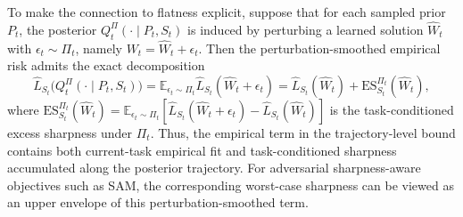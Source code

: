 \documentclass{article}
\begin{document}


To make the connection to flatness explicit, suppose that for each sampled prior $P_t$, the posterior $Q_t^\Pi(\cdot\mid P_t,S_t)$ is induced by perturbing a learned solution $\widehat W_t$ with $\epsilon_t\sim\Pi_t$, namely $W_t=\widehat W_t+\epsilon_t$.
Then the perturbation-smoothed empirical risk admits the exact decomposition
\begin{equation}
\widehat L_{S_t}
\bigl(
Q_t^\Pi(\cdot\mid P_t,S_t)
\bigr)
=
\mathbb E_{\epsilon_t\sim\Pi_t}
\widehat L_{S_t}(\widehat W_t+\epsilon_t)
=
\widehat L_{S_t}(\widehat W_t)
+
\mathrm{ES}_{S_t}^{\Pi_t}(\widehat W_t),
\end{equation}
where
$
\mathrm{ES}_{S_t}^{\Pi_t}(\widehat W_t)
=
\mathbb E_{\epsilon_t\sim\Pi_t}
[
\widehat L_{S_t}(\widehat W_t+\epsilon_t)
-
\widehat L_{S_t}(\widehat W_t)
]
$
is the task-conditioned excess sharpness under $\Pi_t$.
Thus, the empirical term in the trajectory-level bound contains both current-task empirical fit and task-conditioned sharpness accumulated along the posterior trajectory.
For adversarial sharpness-aware objectives such as SAM, the corresponding worst-case sharpness can be viewed as an upper envelope of this perturbation-smoothed term.
\end{document}
